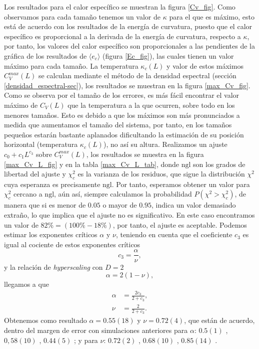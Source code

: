 Los resultados para el calor específico se muestran la figura
\ref{Cv_fig}. Como observamos para cada tamaño tenemos un valor de $\kappa$
para el que es máximo, esto está de acuerdo con los resultados de la energía
de curvatura, puesto que el calor específico es proporcional a la derivada de
la energía de curvatura, respecto a $\kappa$, por tanto, los valores del calor
específico son proporcionales a las pendientes de la gráfica de los resultados
de $\langle e_c\rangle$ (figura \ref{Ec_fig}), las cuales tienen un valor
máximo para cada tamaño. La temperatura $\kappa_c(L)$ y valor de estos máximos
$C_V^{max}(L)$ se calculan mediante el método de la densidad espectral (sección
\ref{densidad_espectral-sec}), los resultados se muestran en la figura \ref{max_Cv_fig}. Como se
observa por el tamaño de los errores, es más fácil encontrar el valor máximo
de $C_V(L)$ que la temperatura a la que ocurren, sobre todo en los menores
tamaños. Esto es debido a que los máximos son más pronunciados a medida que
aumentamos el tamaño del sistema, por tanto, en los tamaños pequeños estarán
bastante aplanados dificultando la estimación de su posición horizontal
(temperatura $\kappa_c(L)$), no así su altura. Realizamos un ajuste
$c_0+c_1L^{c_3}$ sobre $C_V^{max}(L)$, los resultados se muestra en la figura
\ref{max_Cv_L_fig} y en la tabla \ref{max_Cv_L_tab}, donde $\mathrm{ngl}$ son
los grados de libertad del ajuste y $\chi^2_c$ es la varianza de los residuos,
que sigue la distribución $\chi^2$ cuya esperanza es precisamente
$\mathrm{ngl}$. Por tanto, esperamos obtener un valor para $\chi^2_c$ cercano
a $\mathrm{ngl}$, aún así, siempre calculamos la probabilidad
$P(\chi^2>\chi_c^2)$, de manera que si es menor de $0.05$ o mayor de $0.95$,
indica un valor demasiado extraño, lo que implica que el ajuste no es
significativo. En este caso encontramos un valor de $82\%=(100\%-18\%)$, por
tanto, el ajuste es aceptable. Podemos estimar los exponentes críticos $\alpha$ y $\nu$,
teniendo en cuenta que el coeficiente $c_3$ es igual al cociente de estos exponentes
críticos
\begin{equation*}
 c_3=\frac{\alpha}{\nu},
\end{equation*}
y la relación de \textit{hyperscaling} con $D=2$ \cite{Cardy} 
\begin{equation*}
\alpha=2(1-\nu),
\end{equation*}
llegamos a que
\begin{align*}
\alpha&=\frac{2c_3}{2+c_3},\\
\nu&=\frac{2}{2+c_3}.
\end{align*}
Obtenemos como resultado $\alpha=0.55(18)$ y $\nu=0.72(4)$, que están de
acuerdo, dentro del margen de error con simulaciones anteriores para $\alpha$: $0.5(1)$
\cite{Bowick_flat_phase}, $0,58(10)$ \cite{Wheater_Critical_exponents},
$0.44(5)$ \cite{Renken_Scaling_behavior}; y para $\nu$: $0.72(2)$
\cite{Renken_Scaling_behavior}, $0.68(10)$ \cite{Wheater_Critical_exponents},
$0.85(14)$ \cite{Espriu:MCRG}.

